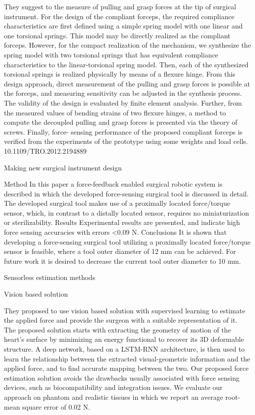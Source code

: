 They suggest to the measure of pulling and grasp forces at the tip of surgical 
instrument. For the design of the compliant forceps, the required compliance 
characteristics are first defined using a simple spring model with one linear 
and one torsional springs. This model may be directly realized as the compliant 
forceps. However, for the compact realization of the mechanism, we synthesize 
the spring model with two torsional springs that has equivalent compliance 
characteristics to the linear-torsional spring model. Then, each of the 
synthesized torsional springs is realized physically by means of a flexure 
hinge. From this design approach, direct measurement of the pulling and grasp 
forces is possible at the forceps, and measuring sensitivity can be adjusted 
in the synthesis process. The validity of the design is evaluated by finite 
element analysis. Further, from the measured values of bending strains of two 
flexure hinges, a method to compute the decoupled pulling and grasp forces is 
presented via the theory of screws. Finally, force- sensing performance of the 
proposed compliant forceps is verified from the experiments of the prototype 
using some weights and load cells. 10.1109/TRO.2012.2194889 

Making new surgical instrument design \cite{schwalb_forcesensing_2017}

Method In this paper a force-feedback enabled surgical robotic system is 
described in which the developed force-sensing surgical tool is discussed in 
detail. The developed surgical tool makes use of a proximally located 
force/torque sensor, which, in contrast to a distally located sensor, 
requires no miniaturization or sterilizability. Results Experimental results 
are presented, and indicate high force sensing accuracies with errors <0.09 N. 
Conclusions It is shown that developing a force-sensing surgical tool utilizing 
a proximally located force/torque sensor is feasible, where a tool outer diameter 
of 12 mm can be achieved. For future work it is desired to decrease the current 
tool outer diameter to 10 mm. 

Sensorless estimation methods

Vision based solution \cite{aviles_towards_2017}

They proposed to use vision based solution with supervised learning to estimate 
the applied force and provide the surgeon with a suitable representation of it.
 The proposed solution starts with extracting the geometry of motion of the 
 heart's surface by minimizing an energy functional to recover its 3D deformable 
 structure. A deep network, based on a LSTM-RNN architecture, is then used to 
 learn the relationship between the extracted visual-geometric information and 
 the applied force, and to find accurate mapping between the two. Our proposed 
 force estimation solution avoids the drawbacks usually associated with force 
 sensing devices, such as biocompatibility and integration issues. We evaluate 
 our approach on phantom and realistic tissues in which we report an average 
 root-mean square error of 0.02 N.

